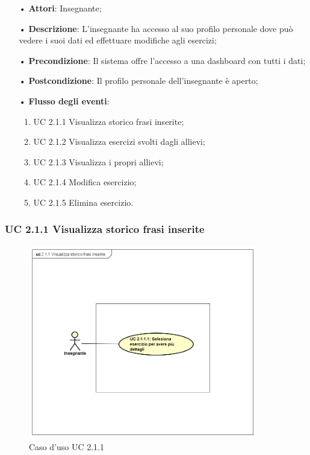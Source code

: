 \begin{itemize}
	\item[•] \textbf{Attori}: Insegnante;
	\item[•] \textbf{Descrizione}: L’insegnante ha accesso al suo profilo personale dove può vedere i suoi dati ed effettuare modifiche agli esercizi;

	\item[•] \textbf{Precondizione}: Il sistema offre l’accesso a una dashboard con tutti i dati;

	\item[•] \textbf{Postcondizione}:  Il profilo personale dell’insegnante è aperto;
	\item[•] \textbf{Flusso degli eventi}:
		\begin{enumerate}
			\item UC 2.1.1 Visualizza storico frasi inserite;
			\item UC 2.1.2 Visualizza esercizi svolti dagli allievi;
			\item UC 2.1.3 Visualizza i propri allievi;
			\item UC 2.1.4 Modifica esercizio;
			\item UC 2.1.5 Elimina esercizio.
		\end{enumerate}
\end{itemize}

\subsubsection{UC 2.1.1  Visualizza storico frasi inserite}

\begin{figure}[H]
\centering
\includegraphics[width=10cm]{img/UC211.png} 
\caption{Caso d'uso UC 2.1.1}
\end{figure}

